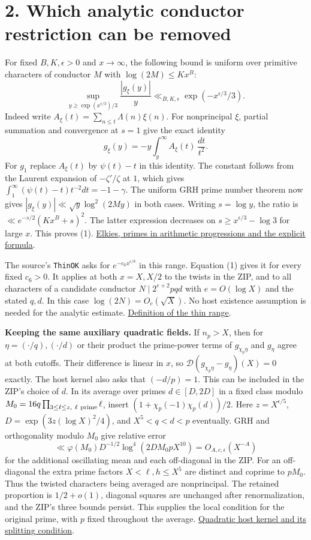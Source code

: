 \documentclass[11pt]{article}
\newcommand{\src}[2]{\href{https://github.com/Deicyde/riemann-hypothesis/blob/e7c8972c701d3396947808ab20cc16dc14623d33/src/#1.lean}{#2}}
\newcommand{\ch}{\chi_p}
\newcommand{\DD}{\mathcal D}
\begin{document}
\section*{2. Which analytic conductor restriction can be removed}
For fixed $B,K,\epsilon>0$ and $x\to\infty$, the following bound is uniform over primitive characters of conductor $M$ with $\log(2M)\le Kx^B$:
\[
 \sup_{y\ge \exp(x^{\epsilon/3})/3}\frac{|g_\xi(y)|}{y}
 \ll_{B,K,\epsilon} \exp(-x^{\epsilon/3}/3).
 \tag{1}
\]
Indeed write $A_\xi(t)=\sum_{n\le t}\Lambda(n)\xi(n)$. For nonprincipal $\xi$, partial summation and convergence at $s=1$ give the exact identity
\[
  g_\xi(y)=-y\int_y^\infty A_\xi(t)\,\frac{dt}{t^2}.
\]
For $g_1$ replace $A_\xi(t)$ by $\psi(t)-t$ in this identity. The constant follows from the Laurent expansion of $-\zeta'/\zeta$ at $1$, which gives $\int_1^\infty(\psi(t)-t)t^{-2}dt=-1-\gamma$. The uniform GRH prime number theorem now gives $|g_\xi(y)|\ll\sqrt y\log^2(2My)$ in both cases. Writing $s=\log y$, the ratio is $\ll e^{-s/2}(Kx^B+s)^2$. The latter expression decreases on $s\ge x^{\epsilon/3}-\log 3$ for large $x$. This proves (1). \href{https://people.math.harvard.edu/~elkies/M229.18/pnt_q.pdf}{Elkies, primes in arithmetic progressions and the explicit formula}.

The source's \texttt{ThinOK} asks for $e^{-c_6x^{\epsilon/8}}$ in this range. Equation (1) gives it for every fixed $c_6>0$. It applies at both $x=X,X/2$ to the twists in the ZIP, and to all characters of a candidate conductor $N\mid 2^{e+2}pqd$ with $e=O(\log X)$ and the stated $q,d$. In this case $\log(2N)=O_c(\sqrt X)$. No host existence assumption is needed for the analytic estimate. \src{Development/AbelianVarietyTheory/Definitions/GlobalTwisting/ThinScalesIffHostBound}{Definition of the thin range}.

\textbf{Keeping the same auxiliary quadratic fields.}
If $n_p>X$, then for $\eta=(\cdot/q),(\cdot/d)$ or their product the prime-power terms of $g_{\ch\eta}$ and $g_\eta$ agree at both cutoffs. Their difference is linear in $x$, so $\DD(g_{\ch\eta}-g_\eta)(X)=0$ exactly. The host kernel also asks that $(-d/p)=1$. This can be included in the ZIP's choice of $d$. In its average over primes $d\in[D,2D]$ in a fixed class modulo $M_0=16q\prod_{3\le\ell\le z,\ \ell\ {\rm prime}}\ell$, insert $(1+\ch(-1)\ch(d))/2$. Here $z=X^{\epsilon/5}$, $D=\exp(3z(\log X)^2/4)$, and $X^5<q<d<p$ eventually. GRH and orthogonality modulo $M_0$ give relative error
\[
 \ll \varphi(M_0)D^{-1/2}\log^4(2DM_0pX^{10})=O_{A,c,\epsilon}(X^{-A})
\]
for the additional oscillating mean and each off-diagonal in the ZIP. For an off-diagonal the extra prime factors $X<\ell,h\le X^5$ are distinct and coprime to $pM_0$. Thus the twisted characters being averaged are nonprincipal. The retained proportion is $1/2+o(1)$, diagonal squares are unchanged after renormalization, and the ZIP's three bounds persist. This supplies the local condition for the original prime, with $p$ fixed throughout the average. \src{Development/AutomorphicArithmetic/CharacterBoxes/KerChiAny}{Quadratic host kernel and its splitting condition}.
\end{document}
